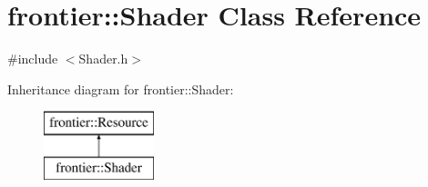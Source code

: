 \hypertarget{classfrontier_1_1_shader}{}\section{frontier\+:\+:Shader Class Reference}
\label{classfrontier_1_1_shader}


{\ttfamily \#include $<$Shader.\+h$>$}

Inheritance diagram for frontier\+:\+:Shader\+:\begin{figure}[H]
\begin{center}
\leavevmode
\includegraphics[height=2.000000cm]{classfrontier_1_1_shader}
\end{center}
\end{figure}
